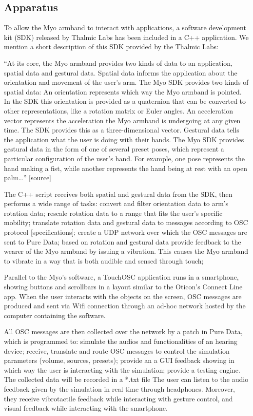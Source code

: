 \documentclass[journal]{./IEEEtran}
\begin{document}
\subsection{Apparatus}
To allow the Myo armband to interact with applications, a software development kit (SDK) released by Thalmic Labs has been included in a C++ application. We mention a short description of this SDK provided by the Thalmic Labs:

“At its core, the Myo armband provides two kinds of data to an application, spatial data and gestural data.
Spatial data informs the application about the orientation and movement of the user's arm. The Myo SDK provides two kinds of spatial data:
An orientation represents which way the Myo armband is pointed. In the SDK this orientation is provided as a quaternion that can be converted to other representations, like a rotation matrix or Euler angles.
An acceleration vector represents the acceleration the Myo armband is undergoing at any given time. The SDK provides this as a three-dimensional vector.
Gestural data tells the application what the user is doing with their hands. The Myo SDK provides gestural data in the form of one of several preset poses, which represent a particular configuration of the user's hand. For example, one pose represents the hand making a fist, while another represents the hand being at rest with an open palm…” [source]

The C++ script receives both spatial and gestural data from the SDK, then performs a wide range of tasks:
convert and filter orientation data to arm’s rotation data;
rescale rotation data to a range that fits the user’s specific mobility;
translate rotation data and gestural data to messages according to OSC protocol [specifications];
create a UDP network over which the OSC messages are sent to Pure Data;
based on rotation and gestural data provide feedback to the wearer of the Myo armband by issuing a vibration. This causes the Myo armband to vibrate in a way that is both audible and sensed through touch;

Parallel to the Myo’s software, a TouchOSC application runs in a smartphone, showing buttons and scrollbars in a layout similar to the Oticon’s Connect Line app. When the user interacts with the objects on the screen, OSC messages are produced and sent via Wifi connection through an ad-hoc network hosted by the computer containing the software.

All OSC messages are then collected over the network by a patch in Pure Data, which is programmed to:
simulate the audios and functionalities of an hearing device;
receive, translate and route OSC messages to control the simulation parameters (volume, sources, presets);
provide an a GUI feedback showing in which way the user is interacting with the simulation;
provide a testing engine. The collected data will be recorded in a *.txt file
The user can listen to the audio feedback given by the simulation in real time through headphones. Moreover, they receive vibrotactile feedback while interacting with gesture control, and visual feedback while interacting with the smartphone.
\end{document}

